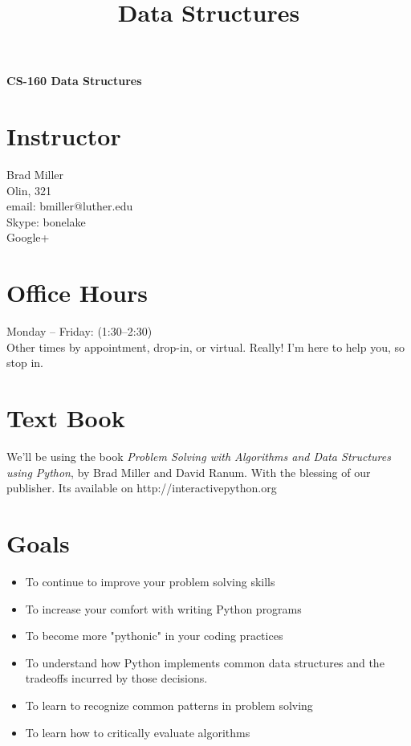 \documentclass[11pt,twocolumn]{article}
\title{Data Structures}
\author{}
\begin{document}
\begin{center}
    {\sffamily\LARGE\bfseries CS-160 Data Structures}
\end{center}

\section*{Instructor}
Brad Miller \\
Olin, 321 \\
email:  bmiller@luther.edu \\
Skype:  bonelake \\
Google+ \\

\section*{Office Hours}
Monday -- Friday: (1:30--2:30) \\
Other times by appointment, drop-in, or virtual.  Really! I'm here to help you, so stop in.

\section*{Text Book}

We'll be using the book \textit{Problem Solving with Algorithms and Data
  Structures using Python}, by Brad Miller and David Ranum.  With the blessing of
our publisher.  Its available on http://interactivepython.org

\section*{Goals}

\begin{itemize}
    \item To continue to improve your problem solving skills
    \item To increase your comfort with writing Python programs
    \item To become more "pythonic" in your coding practices
    \item To understand how Python implements common data structures and the tradeoffs incurred by those decisions.
    \item To learn to recognize common patterns in problem solving
    \item To learn how to critically evaluate algorithms
\end{itemize}
\end{document}
